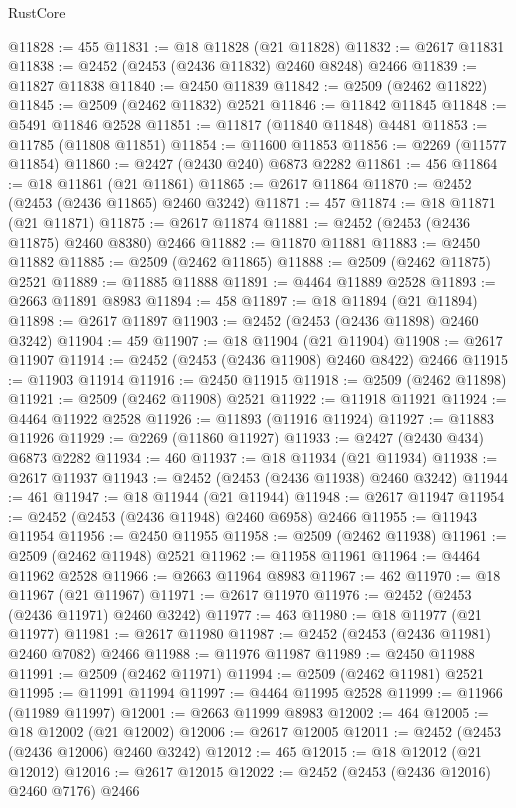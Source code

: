 \begin{lexlean}{RustCore}
\begin{coremodule}
@11828 := 455
@11831 := @18 @11828 (@21 @11828)
@11832 := @2617 @11831
@11838 := @2452 (@2453 (@2436 @11832) @2460 @8248) @2466
@11839 := @11827 @11838
@11840 := @2450 @11839
@11842 := @2509 (@2462 @11822)
@11845 := @2509 (@2462 @11832) @2521
@11846 := @11842 @11845
@11848 := @5491 @11846 @2528
@11851 := @11817 (@11840 @11848) @4481
@11853 := @11785 (@11808 @11851)
@11854 := @11600 @11853
@11856 := @2269 (@11577 @11854)
@11860 := @2427 (@2430 @240) @6873 @2282
@11861 := 456
@11864 := @18 @11861 (@21 @11861)
@11865 := @2617 @11864
@11870 := @2452 (@2453 (@2436 @11865) @2460 @3242)
@11871 := 457
@11874 := @18 @11871 (@21 @11871)
@11875 := @2617 @11874
@11881 := @2452 (@2453 (@2436 @11875) @2460 @8380) @2466
@11882 := @11870 @11881
@11883 := @2450 @11882
@11885 := @2509 (@2462 @11865)
@11888 := @2509 (@2462 @11875) @2521
@11889 := @11885 @11888
@11891 := @4464 @11889 @2528
@11893 := @2663 @11891 @8983
@11894 := 458
@11897 := @18 @11894 (@21 @11894)
@11898 := @2617 @11897
@11903 := @2452 (@2453 (@2436 @11898) @2460 @3242)
@11904 := 459
@11907 := @18 @11904 (@21 @11904)
@11908 := @2617 @11907
@11914 := @2452 (@2453 (@2436 @11908) @2460 @8422) @2466
@11915 := @11903 @11914
@11916 := @2450 @11915
@11918 := @2509 (@2462 @11898)
@11921 := @2509 (@2462 @11908) @2521
@11922 := @11918 @11921
@11924 := @4464 @11922 @2528
@11926 := @11893 (@11916 @11924)
@11927 := @11883 @11926
@11929 := @2269 (@11860 @11927)
@11933 := @2427 (@2430 @434) @6873 @2282
@11934 := 460
@11937 := @18 @11934 (@21 @11934)
@11938 := @2617 @11937
@11943 := @2452 (@2453 (@2436 @11938) @2460 @3242)
@11944 := 461
@11947 := @18 @11944 (@21 @11944)
@11948 := @2617 @11947
@11954 := @2452 (@2453 (@2436 @11948) @2460 @6958) @2466
@11955 := @11943 @11954
@11956 := @2450 @11955
@11958 := @2509 (@2462 @11938)
@11961 := @2509 (@2462 @11948) @2521
@11962 := @11958 @11961
@11964 := @4464 @11962 @2528
@11966 := @2663 @11964 @8983
@11967 := 462
@11970 := @18 @11967 (@21 @11967)
@11971 := @2617 @11970
@11976 := @2452 (@2453 (@2436 @11971) @2460 @3242)
@11977 := 463
@11980 := @18 @11977 (@21 @11977)
@11981 := @2617 @11980
@11987 := @2452 (@2453 (@2436 @11981) @2460 @7082) @2466
@11988 := @11976 @11987
@11989 := @2450 @11988
@11991 := @2509 (@2462 @11971)
@11994 := @2509 (@2462 @11981) @2521
@11995 := @11991 @11994
@11997 := @4464 @11995 @2528
@11999 := @11966 (@11989 @11997)
@12001 := @2663 @11999 @8983
@12002 := 464
@12005 := @18 @12002 (@21 @12002)
@12006 := @2617 @12005
@12011 := @2452 (@2453 (@2436 @12006) @2460 @3242)
@12012 := 465
@12015 := @18 @12012 (@21 @12012)
@12016 := @2617 @12015
@12022 := @2452 (@2453 (@2436 @12016) @2460 @7176) @2466

\end{coremodule}
\end{lexlean}
